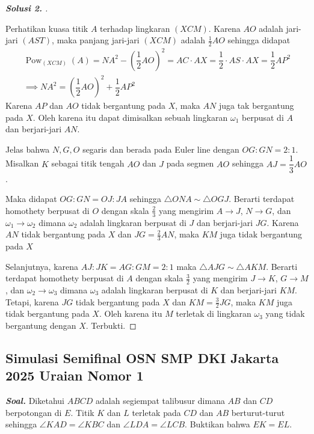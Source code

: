 \documentclass[letterpaper, 13pt]{scrartcl}
\begin{document}
\begin{proof}[\textbf{Solusi 2. }]
\begin{center}
\begin{tikzpicture}[scale=3, dot/.style={circle, fill, inner sep=0.5pt, outer sep=0pt}]
    \end{tikzpicture}
\end{center}

Perhatikan kuasa titik $A$ terhadap lingkaran $(XCM)$. Karena $AO$ adalah jari-jari $(AST)$, maka panjang jari-jari $(XCM)$ adalah $\frac{1}{2}AO$ sehingga didapat
\begin{align*}
    \operatorname{Pow}_{(XCM)} (A) = NA^2 - \left(\dfrac{1}{2}AO\right)^2 = AC \cdot AX = \dfrac{1}{2} \cdot AS \cdot AX = \dfrac{1}{2} AP^2\\
    \implies NA^2 = \left(\dfrac{1}{2}AO\right)^2 + \dfrac{1}{2} AP^2
\end{align*}
Karena $AP$ dan $AO$ tidak bergantung pada $X$, maka $AN$ juga tak bergantung pada $X$. Oleh karena itu dapat dimisalkan sebuah lingkaran $\omega_1$ berpusat di $A$ dan berjari-jari $AN$.

Jelas bahwa $N,G,O$ segaris dan berada pada Euler line dengan $OG:GN=2:1$. Misalkan $K$ sebagai titik tengah $AO$ dan $J$ pada segmen $AO$ sehingga $AJ = \dfrac{1}{3}AO$. 

Maka didapat $OG:GN=OJ:JA$ sehingga $\triangle ONA \sim \triangle OGJ$. Berarti terdapat homothety berpusat di $O$ dengan skala $\frac{2}{3}$ yang mengirim $A \to J$, $N \to G$, dan $\omega_1 \to \omega_2$ dimana $\omega_2$ adalah lingkaran berpusat di $J$ dan berjari-jari $JG$. Karena $AN$ tidak bergantung pada $X$ dan $JG = \frac{2}{3} AN$, maka $KM$ juga tidak bergantung pada $X$

Selanjutnya, karena $AJ:JK=AG:GM=2:1$ maka $\triangle AJG \sim \triangle AKM$. Berarti terdapat homothety berpusat di $A$ dengan skala $\frac{3}{2}$ yang mengirim $J \to K$, $G \to M$, dan $\omega_2 \to \omega_3$ dimana $\omega_3$ adalah lingkaran berpusat di $K$ dan berjari-jari $KM$. Tetapi, karena $JG$ tidak bergantung pada $X$ dan $KM = \frac{3}{2} JG$, maka $KM$ juga tidak bergantung pada $X$. Oleh karena itu $M$ terletak di lingkaran $\omega_3$ yang tidak bergantung dengan $X$. Terbukti.
\end{proof}



\subsection{Simulasi Semifinal OSN SMP DKI Jakarta 2025 Uraian Nomor 1}

\textbf{\textit{Soal. }}Diketahui $ABCD$ adalah segiempat talibusur dimana $AB$ dan $CD$ berpotongan di $E$. Titik $K$ dan $L$ terletak pada $CD$ dan $AB$ berturut-turut sehingga $\angle KAD = \angle KBC$ dan $\angle LDA = \angle LCB$. Buktikan bahwa $EK = EL$.
\end{document}
